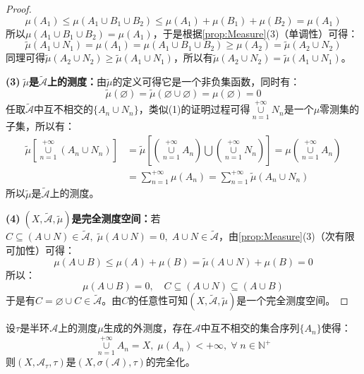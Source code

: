 \begin{proof}
	\begin{equation*}
		\mu(A_1)\leqslant\mu(A_1\cup B_1\cup B_2)\leqslant\mu(A_1)+\mu(B_1)+\mu(B_2)=\mu(A_1)
	\end{equation*}
	所以$\mu(A_1\cup B_1\cup B_2)=\mu(A_1)$，于是根据\cref{prop:Measure}(3)（单调性）可得：
	\begin{equation*}
		\tilde{\mu}(A_1\cup N_1)=\mu(A_1)=\mu(A_1\cup B_1\cup B_2)\geqslant\mu(A_2)=\tilde{\mu}(A_2\cup N_2)
	\end{equation*}
	同理可得$\tilde{\mu}(A_2\cup N_2)\geqslant\tilde{\mu}(A_1\cup N_1)$，所以有$\tilde{\mu}(A_2\cup N_2)=\tilde{\mu}(A_1\cup N_1)$。\par
	\textbf{(3)$\;\tilde{\mu}$是$\tilde{\mathscr{A}}$上的测度：}由$\tilde{\mu}$的定义可得它是一个非负集函数，同时有：
	\begin{equation*}
		\tilde{\mu}(\varnothing)=\tilde{\mu}(\varnothing\cup\varnothing)=\mu(\varnothing)=0
	\end{equation*}
	任取$\tilde{\mathscr{A}}$中互不相交的$\{A_n\cup N_n\}$，类似(1)的证明过程可得$\underset{n=1}{\overset{+\infty}{\cup}}N_n$是一个$\mu$零测集的子集，所以有：
	\begin{align*}
		\tilde{\mu}\left[\underset{n=1}{\overset{+\infty}{\cup}}(A_n\cup N_n)\right]&=\tilde{\mu}\left[\left(\underset{n=1}{\overset{+\infty}{\cup}}A_n\right)\bigcup\left(\underset{n=1}{\overset{+\infty}{\cup}}N_n\right)\right]=\mu\left(\underset{n=1}{\overset{+\infty}{\cup}}A_n\right) \\
		&=\sum_{n=1}^{+\infty}\mu(A_n)=\sum_{n=1}^{+\infty}\tilde{\mu}(A_n\cup N_n)
	\end{align*}
	所以$\tilde{\mu}$是$\tilde{\mathscr{A}}$上的测度。\par
	\textbf{(4)$\;(X,\tilde{\mathscr{A}},\tilde{\mu})$是完全测度空间：}若$C\subseteq(A\cup N)\in\tilde{\mathscr{A}},\;\tilde{\mu}(A\cup N)=0,\;A\cup N\in\tilde{\mathscr{A}}$，由\cref{prop:Measure}(3)（次有限可加性）可得：
	\begin{equation*}
		\mu(A\cup B)\leqslant\mu(A)+\mu(B)=\tilde{\mu}(A\cup N)+\mu(B)=0
	\end{equation*}
	所以：
	\begin{equation*}
		\mu(A\cup B)=0,\quad C\subseteq(A\cup N)\subseteq(A\cup B)
	\end{equation*}
	于是有$C=\varnothing\cup C\in\tilde{\mathscr{A}}$。由$C$的任意性可知$(X,\tilde{\mathscr{A}},\tilde{\mu})$是一个完全测度空间。
\end{proof}
\begin{theorem}\label{theo:CompletedExterior}
	设$\tau$是半环$\mathscr{A}$上的测度$\mu$生成的外测度，存在$\mathscr{A}$中互不相交的集合序列$\{A_n\}$使得：
	\begin{equation*}
		\underset{n=1}{\overset{+\infty}{\cup}}A_n=X,\;\mu(A_n)<+\infty,\;\forall\;n\in\mathbb{N}^+
	\end{equation*}
	则$(X,\mathscr{A}_\tau,\tau)$是$(X,\sigma(\mathscr{A}),\tau)$的完全化。
\end{theorem}
